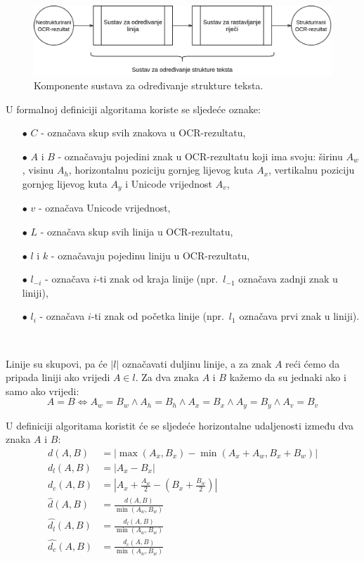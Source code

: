 \documentclass[times, utf8, zavrsni]{fer}
\begin{document}
\

\begin{figure}[htb]
    \centering
    \captionsetup{justification=centering,margin=2cm}
    \includegraphics[width=\textwidth]{images/sustav-03.png}
    \caption{
        Komponente sustava za određivanje strukture teksta.
    }
    \label{fig:sustav-03}
\end{figure}

U formalnoj definiciji algoritama koriste se sljedeće oznake:
\begin{itemize}
    \item[$\bullet$] $C$ - označava skup svih znakova u OCR-rezultatu,
    \item[$\bullet$] $A$ i $B$ - označavaju pojedini znak u OCR-rezultatu koji
    ima svoju: širinu $A_w$, visinu $A_h$, horizontalnu poziciju gornjeg
    lijevog kuta $A_x$, vertikalnu poziciju gornjeg lijevog kuta $A_y$ i
    Unicode vrijednost $A_v$,
    \item[$\bullet$] $v$ - označava Unicode vrijednost,
    \item[$\bullet$] $L$ - označava skup svih linija u OCR-rezultatu,
    \item[$\bullet$] $l$ i $k$ - označavaju pojedinu liniju u OCR-rezultatu,
    \item[$\bullet$] $l_{-i}$ - označava $i$-ti znak od kraja linije
    (npr.\ $l_{-1}$ označava zadnji znak u liniji),
    \item[$\bullet$] $l_i$ - označava $i$-ti znak od početka linije (npr.\ $l_1$ označava prvi znak u liniji).
\end{itemize}

\

Linije su skupovi, pa će $|l|$ označavati duljinu linije,
a za znak $A$ reći ćemo da pripada liniji ako vrijedi $A \in l$.
Za dva znaka $A$ i $B$ kažemo da su jednaki ako i samo ako vrijedi:
\[
A = B \iff
A_w = B_w \land A_h = B_h \land A_x = B_x \land A_y = B_y \land A_v = B_v
\]

U definiciji algoritama koristit će se sljedeće horizontalne udaljenosti između dva znaka $A$ i $B$:
\begin{align}
d(A, B) &= |\max(A_x, B_x) - \min(A_x + A_w, B_x + B_w)| \\
d_l(A, B) &= |A_x - B_x| \\
d_c(A, B) &= |A_x + \frac{A_w}{2} - (B_x + \frac{B_w}{2})| \\
\hat{d}(A, B) &= \frac{d(A, B)}{\min(A_w, B_w)} \\
\hat{d_l}(A, B) &= \frac{d_l(A, B)}{\min(A_w, B_w)} \\
\hat{d_c}(A, B) &= \frac{d_c(A, B)}{\min(A_w, B_w)}
\end{align}
\end{document}
